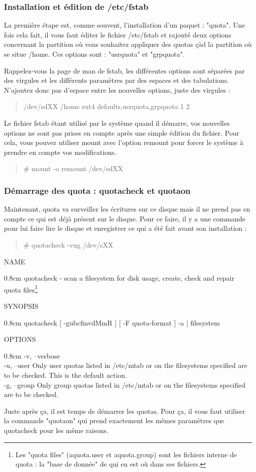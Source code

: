 \documentclass[a4paper,11pt]{article}
\newcommand{\commande}[1] {
    \begin{quote}
    \tt\raggedright #1 
    \end{quote}
}
\newcommand{\man}[2]{
    \begin{tcolorbox}[toprule=3mm,width=\textwidth,outer arc=0mm,colbacktitle=grayman,coltitle=black,colback={grayman},colframe={grayman},title={man : \tt #1}]
        \tt\raggedright #2
    \end{tcolorbox}
}
\newcommand{\mandesc}[1]{
    \begin{adjustwidth}{0.8cm}{}
        #1
    \end{adjustwidth}
}
\begin{document}
\subsubsection{Installation et édition de /etc/fstab}
\par La première étape est, comme souvent, l'installation d'un paquet : "quota". Une fois cela fait, il vous faut éditer le fichier /etc/fstab et rajouté deux options concernant la partition où vous souhaitez appliquer des quotas çàd la partition où se situe /home. Ces options sont : "usrquota" et "grpquota".
\par Rappelez-vous la page de man de fstab, les différentes options sont séparées par des virgules et les différents paramètres par des espaces et des tabulations. N'ajoutez donc pas d'espace entre les nouvelles options, juste des virgules :
\commande{/dev/sdXX /home ext4 defaults,usrquota,grpquota 1 2}
\par Le fichier fstab étant utilisé par le système quand il démarre, vos nouvelles options ne sont pas prises en compte après une simple édition du fichier. Pour cela, vous pouvez utiliser mount avec l'option remount pour forcer le système à prendre en compte vos modifications.
\commande{\# mount -o remount /dev/sdXX}

\subsubsection{Démarrage des quota : quotacheck et quotaon}
\par Maintenant, quota va surveiller les écritures sur ce disque mais il ne prend pas en compte ce qui est déjà présent sur le disque. Pour ce faire, il y a une commande pour lui faire lire le disque et enregistrer ce qui a été fait avant son installation :
\commande{\# quotacheck -vug /dev/sXX}
\man{quotacheck}{NAME
\mandesc{quotacheck - scan a filesystem for disk usage, create, check and repair quota files\footnote{Les "quota files" (aquota.user et aquota.group) sont les fichiers interne de quota : la "base de donnée" de qui en est où dans ses fichiers.}}
SYNOPSIS
\mandesc{quotacheck [ -gubcfinvdMmR ] [ -F quota-format ] -a | filesystem}
OPTIONS
\mandesc{-v, --verbose\\
-u, --user Only user quotas listed in /etc/mtab or on the filesystems specified are to be checked.  This is the default action.\\
-g, --group Only group quotas listed in /etc/mtab or on the filesystems specified are to be checked.
}
}
\par Juste après ça, il est temps de démarrer les quotas. Pour ça, il vous faut utiliser la commande "quotaon" qui prend exactement les mêmes paramètres que quotacheck pour les même raisons.
\end{document}
